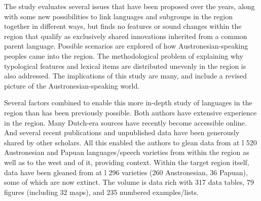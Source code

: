 The study evaluates several issues that have been proposed over the years,
along with some new possibilities to link languages
and subgroups in the region together in different ways,
but finds no features or sound changes within the region that qualify as exclusively
shared innovations inherited from a common parent language.
Possible scenarios are explored of how Austronesian-speaking peoples came into the region.
The methodological problem of explaining why typological features
and lexical items are distributed unevenly in the region is also addressed.
The implications of this study are many,
and include a revised picture of the Austronesian-speaking world.

Several factors combined to enable this more in-depth study
of languages in the region than has been previously possible.
Both authors have extensive experience in the region.
Many Dutch-era sources have recently become accessible online.
And several recent publications
and unpublished data have been generously shared by other scholars.
All this enabled the authors to glean data from at l 520 Austronesian
and Papuan languages/speech varieties from within the region as well as to the west
and  of it,
providing context.
Within the target region itself,
data have been gleaned from at l 296 varieties (260 Austronesian, 36 Papuan),
some of which are now extinct.
The volume is data rich with 317 data tables,
79 figures (including 32 maps),
and 235 numbered examples/lists.
 
 